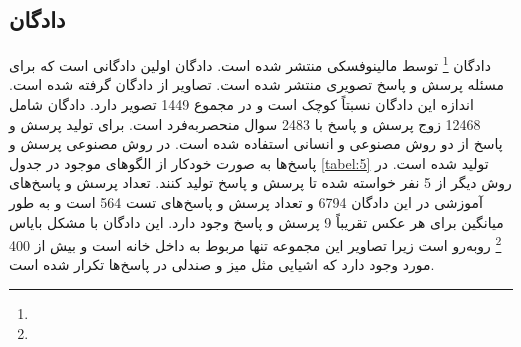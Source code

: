 \subsection{ دادگان }
	دادگان
	\footnote{}\cite{malinowski2014multi}
	توسط مالینوفسکی منتشر ‌شده ‌است. دادگان 
اولین دادگانی است که برای مسئله پرسش و پاسخ تصویری منتشر ‌شده ‌است. تصاویر از دادگان
  \cite{silberman2012indoor}
   گرفته ‌شده ‌است.  اندازه این دادگان نسبتاً کوچک است و در مجموع 1449 تصویر دارد. دادگان
 شامل 12468 زوج پرسش و پاسخ با 2483 سوال منحصربه‌فرد است. برای تولید پرسش و پاسخ‌ از دو روش مصنوعی و انسانی استفاده ‌شده ‌است. در روش مصنوعی پرسش و پاسخ‌ها به صورت خودکار از الگوهای موجود در جدول
 \ref{tabel:5}
  تولید ‌شده ‌است. در روش دیگر از 5 نفر خواسته ‌شده‌ تا پرسش و پاسخ تولید کنند. تعداد پرسش و پاسخ‌های آموزشی در این ‌دادگان 6794 و تعداد پرسش و پاسخ‌های تست 564 است و به طور میانگین برای هر عکس تقریباً 9 پرسش و پاسخ وجود دارد. این دادگان با مشکل بایاس 
  \footnote{}
  روبه‌رو است زیرا تصاویر این مجموعه تنها مربوط به داخل خانه است و بیش از 400 مورد وجود دارد که اشیایی مثل میز و صندلی در پاسخ‌ها تکرار شده ‌است.
